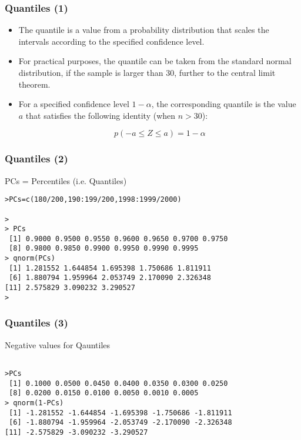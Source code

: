 \documentclass[a4]{beamer}
\begin{document}
\begin{frame}
\frametitle{Quantiles (1) }

\begin{itemize}
\item The quantile is a value from a probability distribution that scales the intervals according to the specified confidence level.
\item For practical purposes, the quantile can be taken from the standard normal distribution, if the sample is larger than 30, further to the central limit theorem.
\item For a specified confidence level $1-\alpha $, the corresponding quantile is the value $a$ that satisfies the following identity (when $n > 30$):

    \[ p( -a \leq Z \leq a) = 1- \alpha \]

\end{itemize}

\end{frame}


\begin{frame}[fragile]
\frametitle{Quantiles (2)}
PCs = Percentiles (i.e. Quantiles)
\begin{verbatim}
>PCs=c(180/200,190:199/200,1998:1999/2000)

>
> PCs
 [1] 0.9000 0.9500 0.9550 0.9600 0.9650 0.9700 0.9750
 [8] 0.9800 0.9850 0.9900 0.9950 0.9990 0.9995
> qnorm(PCs)
 [1] 1.281552 1.644854 1.695398 1.750686 1.811911
 [6] 1.880794 1.959964 2.053749 2.170090 2.326348
[11] 2.575829 3.090232 3.290527
>
\end{verbatim}
\end{frame}

\begin{frame}[fragile]
\frametitle{Quantiles (3)}
Negative values for Qauntiles
\begin{verbatim}

>PCs
 [1] 0.1000 0.0500 0.0450 0.0400 0.0350 0.0300 0.0250
 [8] 0.0200 0.0150 0.0100 0.0050 0.0010 0.0005
> qnorm(1-PCs)
 [1] -1.281552 -1.644854 -1.695398 -1.750686 -1.811911
 [6] -1.880794 -1.959964 -2.053749 -2.170090 -2.326348
[11] -2.575829 -3.090232 -3.290527
\end{verbatim}
\end{frame}
\end{document}
